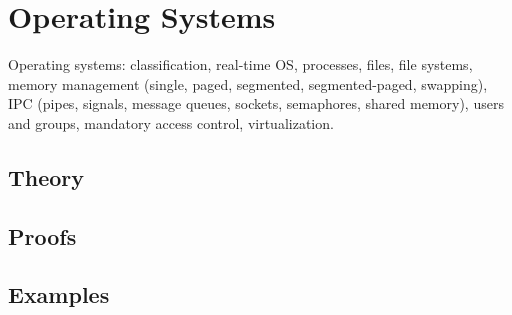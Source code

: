 
\section{Operating Systems}
\label{sec:2.3b.06-operating-systems}

\begin{ticket}
Operating systems: classification, real-time OS, processes, files, file systems, memory management (single, paged, segmented, segmented-paged, swapping), IPC (pipes, signals, message queues, sockets, semaphores, shared memory), users and groups, mandatory access control, virtualization.
\end{ticket}

\subsection*{Theory}

\subsection*{Proofs}

\subsection*{Examples}
